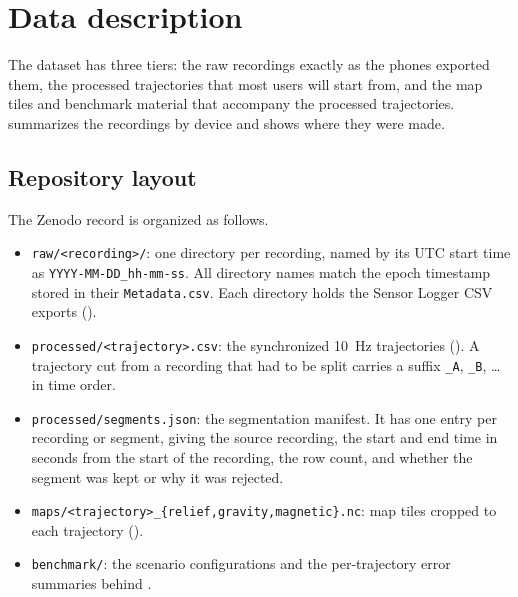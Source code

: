 \section{Data description}
\label{sec:description}

The dataset has three tiers: the raw recordings exactly as the phones exported them, the processed trajectories that most users will start from, and the map tiles and benchmark material that accompany the processed trajectories.  summarizes the recordings by device and  shows where they were made.

\subsection{Repository layout}
\label{sec:layout}

The Zenodo record  is organized as follows. 

\begin{itemize}
\item \texttt{raw/<recording>/}: one directory per recording, named by its UTC start time as \texttt{YYYY-MM-DD\_hh-mm-ss}. All \numUtcNamed{} directory names match the epoch timestamp stored in their \texttt{Metadata.csv}. Each directory holds the Sensor Logger CSV exports ().
\item \texttt{processed/<trajectory>.csv}: the \numTrajectories{} synchronized 10~Hz trajectories (). A trajectory cut from a recording that had to be split carries a suffix \texttt{\_A}, \texttt{\_B}, \ldots{} in time order.
\item \texttt{processed/segments.json}: the segmentation manifest. It has one entry per recording or segment, giving the source recording, the start and end time in seconds from the start of the recording, the row count, and whether the segment was kept or why it was rejected.
\item \texttt{maps/<trajectory>\_\{relief,gravity,magnetic\}.nc}: map tiles cropped to each trajectory ().
\item \texttt{benchmark/}: the scenario configurations and the per-trajectory error summaries behind .
\end{itemize}

\begin{table}[t]
\centering
\caption{Recordings by device, as identified in each recording's \texttt{Metadata.csv}. \emph{Rec.}\ counts raw recordings and \emph{Traj.}\ counts processed trajectories; hours and distance are those of the processed trajectories. \emph{GNSS file} is the raw file that the processed GNSS columns are taken from: \texttt{LocationGps} is Android's GNSS-only provider and \texttt{Location} is the platform's fused location service.}
\label{tab:devices}
\small

\end{table}

